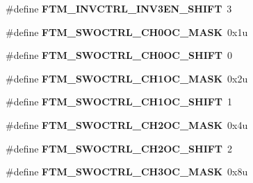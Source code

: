 \begin{DoxyCompactItemize}
\item 
\#define {\bfseries F\+T\+M\+\_\+\+I\+N\+V\+C\+T\+R\+L\+\_\+\+I\+N\+V3\+E\+N\+\_\+\+S\+H\+I\+FT}~3\hypertarget{group__FTM__Register__Masks_gaeaa778d3ec63bd86c6a5e840eebfcbe7}{}\label{group__FTM__Register__Masks_gaeaa778d3ec63bd86c6a5e840eebfcbe7}

\item 
\#define {\bfseries F\+T\+M\+\_\+\+S\+W\+O\+C\+T\+R\+L\+\_\+\+C\+H0\+O\+C\+\_\+\+M\+A\+SK}~0x1u\hypertarget{group__FTM__Register__Masks_ga1d6ba2b311aaea0d8857a2eff1a79f9b}{}\label{group__FTM__Register__Masks_ga1d6ba2b311aaea0d8857a2eff1a79f9b}

\item 
\#define {\bfseries F\+T\+M\+\_\+\+S\+W\+O\+C\+T\+R\+L\+\_\+\+C\+H0\+O\+C\+\_\+\+S\+H\+I\+FT}~0\hypertarget{group__FTM__Register__Masks_ga8a9c262029f5302d089e536c8c44b499}{}\label{group__FTM__Register__Masks_ga8a9c262029f5302d089e536c8c44b499}

\item 
\#define {\bfseries F\+T\+M\+\_\+\+S\+W\+O\+C\+T\+R\+L\+\_\+\+C\+H1\+O\+C\+\_\+\+M\+A\+SK}~0x2u\hypertarget{group__FTM__Register__Masks_gab033c2350b9eb73407eea7d5be5902bc}{}\label{group__FTM__Register__Masks_gab033c2350b9eb73407eea7d5be5902bc}

\item 
\#define {\bfseries F\+T\+M\+\_\+\+S\+W\+O\+C\+T\+R\+L\+\_\+\+C\+H1\+O\+C\+\_\+\+S\+H\+I\+FT}~1\hypertarget{group__FTM__Register__Masks_ga91d92f8443196bd3f816110707c70355}{}\label{group__FTM__Register__Masks_ga91d92f8443196bd3f816110707c70355}

\item 
\#define {\bfseries F\+T\+M\+\_\+\+S\+W\+O\+C\+T\+R\+L\+\_\+\+C\+H2\+O\+C\+\_\+\+M\+A\+SK}~0x4u\hypertarget{group__FTM__Register__Masks_gafb399bfe91227e3c1ef409df4f3296b9}{}\label{group__FTM__Register__Masks_gafb399bfe91227e3c1ef409df4f3296b9}

\item 
\#define {\bfseries F\+T\+M\+\_\+\+S\+W\+O\+C\+T\+R\+L\+\_\+\+C\+H2\+O\+C\+\_\+\+S\+H\+I\+FT}~2\hypertarget{group__FTM__Register__Masks_gabafc3c919320572e1474319804e13958}{}\label{group__FTM__Register__Masks_gabafc3c919320572e1474319804e13958}

\item 
\#define {\bfseries F\+T\+M\+\_\+\+S\+W\+O\+C\+T\+R\+L\+\_\+\+C\+H3\+O\+C\+\_\+\+M\+A\+SK}~0x8u\hypertarget{group__FTM__Register__Masks_ga67e490e5fc532feaba50ac976a8ba91c}{}\label{group__FTM__Register__Masks_ga67e490e5fc532feaba50ac976a8ba91c}


\end{DoxyCompactItemize}
